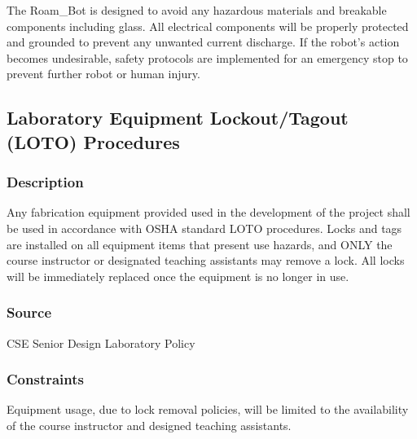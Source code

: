 

The Roam\_Bot is designed to avoid any hazardous materials and breakable components including glass. All electrical components will be properly protected and grounded to prevent any unwanted current discharge. If the robot's action becomes undesirable, safety protocols are implemented for an emergency stop to prevent further robot or human injury.



\subsection{Laboratory Equipment Lockout/Tagout (LOTO) Procedures}
\subsubsection{Description}
Any fabrication equipment provided used in the development of the project shall be used in accordance with OSHA standard LOTO procedures. Locks and tags are installed on all equipment items that present use hazards, and ONLY the course instructor or designated teaching assistants may remove a lock. All locks will be immediately replaced once the equipment is no longer in use.

\subsubsection{Source}
CSE Senior Design Laboratory Policy

\subsubsection{Constraints}
Equipment usage, due to lock removal policies, will be limited to the availability of the course instructor and designed teaching assistants.


